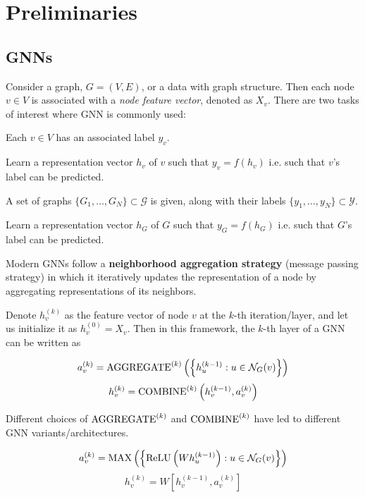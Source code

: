 \chapter{Preliminaries}

\section{GNNs}

Consider a graph, $G = (V, E)$, or a data with graph structure. Then each node $v \in V$ is associated with a {\it node feature vector}, denoted as $X_v$.
There are two tasks of interest where GNN is commonly used:

\begin{problem}
Each $v \in V$ has an associated label $y_v$.

 Learn a representation vector $h_v$ of $v$ such that $y_v = f(h_v)$ i.e. such that $v$'s label can be predicted.
\end{problem}


\begin{problem}
A set of graphs $\{G_1, \dots, G_N\} \subset \mathcal{G}$ is given, along with their labels $\{y_1, \dots, y_N\} \subset \mathcal{Y}$.

 Learn a representation vector $h_G$ of $G$ such that $y_G = f(h_G)$ i.e. such that $G$'s label can be predicted. 
\end{problem}


Modern GNNs follow a {\bf neighborhood aggregation strategy} (message passing strategy) in which it iteratively updates the representation of a node by aggregating representations of its neighbors.

Denote $h_v^{(k)}$ as the feature vector of node $v$ at the $k$-th iteration/layer, and let us initialize it as $h_v^{(0)} = X_v$.
Then in this framework, the $k$-th layer of a GNN can be written as

	$$a_v^{(k)} = \operatorname{AGGREGATE}^{(k)} \left( \left\{ h_u^{(k - 1)} : u \in \mathcal{N}_G(v) \right\} \right)$$
	$$h_v^{(k)} = \operatorname{COMBINE}^{(k)} \left( h_v^{(k - 1)}, a_v^{(k)} \right)$$

Different choices of $\operatorname{AGGREGATE}^{(k)}$ and $\operatorname{COMBINE}^{(k)}$ have led to different GNN variants/architectures.

\begin{architecture}
	$$a_v^{(k)} = \operatorname{MAX} \left( \left\{ \operatorname{ReLU} \left( W h_u^{(k - 1)} \right) : u \in \mathcal{N}_G(v) \right\} \right)$$
	$$h_v^{(k)} = W \left[ h_v^{(k - 1)}, a_v^{(k)} \right]$$
\end{architecture}

